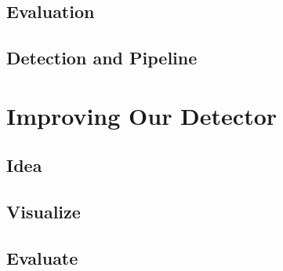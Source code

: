 \documentclass[11pt,a4paper, twocolumn]{article}
\begin{document}
	\subsection{Evaluation}
	\subsection{Detection and Pipeline}
	\section{Improving Our Detector}
	\subsection{Idea}
	\subsection{Visualize}
	\subsection{Evaluate}
\end{document}
